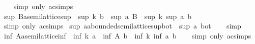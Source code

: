 \begin{isabellebody}
%
\isadelimproof
\ \ %
\endisadelimproof
%
\isatagproof
{}\isamarkupfalse%
\ {\isacharparenleft}{\kern0pt}simp\ only{\isacharcolon}{\kern0pt}\ ac{\isacharunderscore}{\kern0pt}simps{\isacharparenright}{\kern0pt}%
\endisatagproof
{\isafoldproof}%
%
\isadelimproof
\isanewline
%
\endisadelimproof
\isanewline
{}\isamarkupfalse%
\ sup{}{\isacharcolon}{\kern0pt}\ {\isachardoublequoteopen}{\isacharparenleft}{\kern0pt}B{\isacharcolon}{\kern0pt}{\isacharcolon}{\kern0pt}{\isacharprime}{\kern0pt}a{\isacharcolon}{\kern0pt}{\isacharcolon}{\kern0pt}semilattice{\isacharunderscore}{\kern0pt}sup{\isacharparenright}{\kern0pt}\ {\isasymequiv}\ sup\ k\ b\ {\isasymLongrightarrow}\ sup\ a\ B\ {\isasymequiv}\ sup\ k\ {\isacharparenleft}{\kern0pt}sup\ a\ b{\isacharparenright}{\kern0pt}{\isachardoublequoteclose}\isanewline
%
\isadelimproof
\ \ %
\endisadelimproof
%
\isatagproof
{}\isamarkupfalse%
\ {\isacharparenleft}{\kern0pt}simp\ only{\isacharcolon}{\kern0pt}\ ac{\isacharunderscore}{\kern0pt}simps{\isacharparenright}{\kern0pt}%
\endisatagproof
{\isafoldproof}%
%
\isadelimproof
\isanewline
%
\endisadelimproof
\isanewline
{}\isamarkupfalse%
\ sup{}{\isacharcolon}{\kern0pt}\ {\isachardoublequoteopen}{\isacharparenleft}{\kern0pt}a{\isacharcolon}{\kern0pt}{\isacharcolon}{\kern0pt}{\isacharprime}{\kern0pt}a{\isacharcolon}{\kern0pt}{\isacharcolon}{\kern0pt}bounded{\isacharunderscore}{\kern0pt}semilattice{\isacharunderscore}{\kern0pt}sup{\isacharunderscore}{\kern0pt}bot{\isacharparenright}{\kern0pt}\ {\isasymequiv}\ sup\ a\ bot{\isachardoublequoteclose}\isanewline
%
\isadelimproof
\ \ %
\endisadelimproof
%
\isatagproof
{}\isamarkupfalse%
\ simp%
\endisatagproof
{\isafoldproof}%
%
\isadelimproof
\isanewline
%
\endisadelimproof
\isanewline
{}\isamarkupfalse%
\ inf{}{\isacharcolon}{\kern0pt}\ {\isachardoublequoteopen}{\isacharparenleft}{\kern0pt}A{\isacharcolon}{\kern0pt}{\isacharcolon}{\kern0pt}{\isacharprime}{\kern0pt}a{\isacharcolon}{\kern0pt}{\isacharcolon}{\kern0pt}semilattice{\isacharunderscore}{\kern0pt}inf{\isacharparenright}{\kern0pt}\ {\isasymequiv}\ inf\ k\ a\ {\isasymLongrightarrow}\ inf\ A\ b\ {\isasymequiv}\ inf\ k\ {\isacharparenleft}{\kern0pt}inf\ a\ b{\isacharparenright}{\kern0pt}{\isachardoublequoteclose}\isanewline
%
\isadelimproof
\ \ %
\endisadelimproof
%
\isatagproof
{}\isamarkupfalse%
\ {\isacharparenleft}{\kern0pt}simp\ only{\isacharcolon}{\kern0pt}\ ac{\isacharunderscore}{\kern0pt}simps{\isacharparenright}{\kern0pt}%
\endisatagproof

\end{isabellebody}
